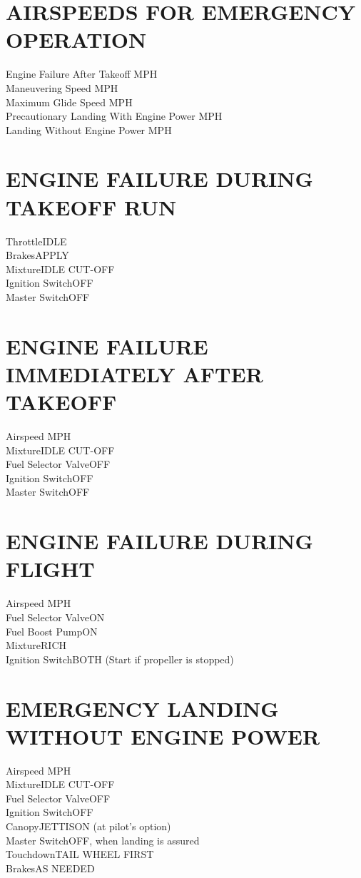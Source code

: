 \documentclass{article}
\begin{document}
\vspace*{-2em}
\begin{multicols*}{2}
\section*{AIRSPEEDS FOR EMERGENCY OPERATION}
Engine Failure After Takeoff MPH\\
Maneuvering Speed MPH\\
Maximum Glide Speed MPH\\
Precautionary Landing With Engine Power MPH\\
Landing Without Engine Power MPH
\section*{ENGINE FAILURE DURING TAKEOFF RUN}
Throttle\dotfill IDLE\\
Brakes\dotfill APPLY\\
Mixture\dotfill IDLE CUT-OFF\\
Ignition Switch\dotfill OFF\\
Master Switch\dotfill OFF
\section*{ENGINE FAILURE IMMEDIATELY AFTER TAKEOFF}
Airspeed MPH\\
Mixture\dotfill IDLE CUT-OFF\\
Fuel Selector Valve\dotfill OFF\\
Ignition Switch\dotfill OFF\\
Master Switch\dotfill OFF
\section*{ENGINE FAILURE DURING FLIGHT}
Airspeed MPH\\
Fuel Selector Valve\dotfill ON\\
Fuel Boost Pump\dotfill ON\\
Mixture\dotfill RICH\\
Ignition Switch\dotfill BOTH (Start if propeller is stopped)
\section*{EMERGENCY LANDING WITHOUT ENGINE POWER}
Airspeed MPH\\
Mixture\dotfill IDLE CUT-OFF\\
Fuel Selector Valve\dotfill OFF\\
Ignition Switch\dotfill OFF\\
Canopy\dotfill JETTISON (at pilot's option)\\
Master Switch\dotfill OFF, when landing is assured\\
Touchdown\dotfill TAIL WHEEL FIRST\\
Brakes\dotfill AS NEEDED

\end{multicols*}
\end{document}
